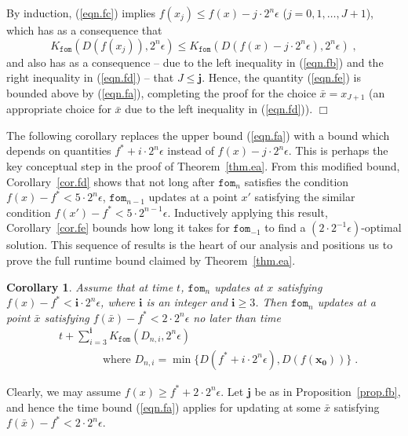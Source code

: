 \documentclass[reqno, 11pt]{amsart}
\newtheorem{cor}[prop]{Corollary}
\numberwithin{equation}{section}
\newcommand{\fom}{\mathtt{fom}}
\begin{document}
 By induction, (\ref{eqn.fc}) implies $ f(x_j) \leq f(x) - j \cdot 2^n \epsilon $ ($ j = 0,1, \ldots, J+1 $), which has as a consequence that 
 \[ K_{\fom}(D(f(x_j)),2^n \epsilon) \leq K_{\fom}(D(f(x) - j \cdot 2^n \epsilon),2^n \epsilon) \; ,  \]
and also has as a consequence -- due to the left inequality in (\ref{eqn.fb})  and the right inequality in (\ref{eqn.fd})  -- that $ J \leq \mathbf{j} $.   
Hence, the quantity (\ref{eqn.fe})  is bounded above by (\ref{eqn.fa}), completing the proof for the choice $ \bar{x} = x_{J+1} $ (an appropriate choice for $ \bar{x} $  due to the left inequality in (\ref{eqn.fd})). \hfill $ \Box $
\vspace{2mm}

 

The following corollary replaces the upper bound (\ref{eqn.fa}) with a bound which depends on quantities $ f^* + i \cdot 2^n \epsilon $ instead of $ f(x) - j \cdot 2^n \epsilon $. This is perhaps the key conceptual step in the proof of Theorem~\ref{thm.ea}.
From this modified bound, Corollary~\ref{cor.fd} shows that not long after $ \fom_n $ satisfies the condition $ f(x) - f^* < 5 \cdot 2^n \epsilon $, $ \fom_{n-1} $ updates at a point $x'$ satisfying the similar condition $ f(x') - f^* < 5 \cdot 2^{n-1} \epsilon $. Inductively applying this result, Corollary~\ref{cor.fe} bounds how long it takes for $ \fom_{-1} $ to find a $(2\cdot 2^{-1}\epsilon)$-optimal solution. This sequence of results is the heart of our analysis and positions us to prove the full runtime bound claimed by Theorem~\ref{thm.ea}.

\begin{cor} \label{cor.fc} 
Assume that at time $ t $, $ \fom_n $ updates at $ x $ satisfying $  f(x) - f^* < \mathbf{i}  \cdot 2^n \epsilon $, 
where $ \mathbf{i}  $ is an integer and $ \mathbf{i} \geq 3 $. Then $ \fom_n $ updates at a point $ \bar{x} $ satisfying  $ f( \bar{x}) - f^* < 2 \cdot 2^n \epsilon $ no later than time
\begin{align}
  & t + \sum_{i=3}^{ \mathbf{i}} K_{\fom}(D_{n,i}, 2^n \epsilon) \label{eqn.ff}  \\
   & \qquad  \qquad  \textrm{where} \, \, D_{n,i} = \min \{ D(f^* + i \cdot 2^n \epsilon), D(f(\mathbf{x_0}  ) ) \} \; . \label{eqn.fg} 
   \end{align}
 \end{cor}
  Clearly, we may assume $ f(x) \geq f^* + 2 \cdot 2^n \epsilon $. Let $ \mathbf{j} $ be as in Proposition~\ref{prop.fb}, and hence the time bound (\ref{eqn.fa})  applies for updating at some $ \bar{x} $ satisfying $ f( \bar{x}) - f^* < 2 \cdot 2^n \epsilon $.  
  
\end{document}
